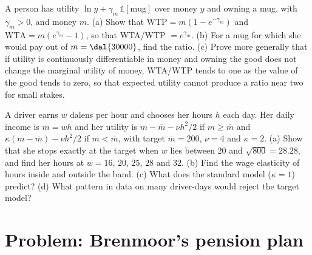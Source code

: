 \begin{exercise}[$\star\star\star$]\label{exo:b2:behavioural-evidence:11}
A person has utility $\ln y + \gamma_m\,\mathbb{1}[\text{mug}]$ over money $y$ and owning a mug, with
$\gamma_m > 0$, and money $m$. (a) Show that $\mathrm{WTP} = m(1 - e^{-\gamma_m})$ and $\mathrm{WTA} =
m(e^{\gamma_m} - 1)$, so that WTA/WTP $= e^{\gamma_m}$. (b) For a mug for which she would pay 
out of $m = \dal{30000}$, find the ratio. (c) Prove more generally that if utility is continuously differentiable in money and owning the good
does not change the marginal utility of money, WTA/WTP tends to one as the value of the good tends to
zero, so that expected utility cannot produce a ratio near two for small stakes.
\end{exercise}

\begin{exercise}[$\star\star\star$]\label{exo:b2:behavioural-evidence:12}
A driver earns $w$ dalens per hour and chooses her hours $h$ each day. Her daily income is $m = wh$ and
her utility is $m - \bar m - \nu h^2/2$ if $m \ge \bar m$ and $\kappa(m - \bar m) - \nu h^2/2$ if $m <
\bar m$, with target $\bar m = 200$, $\nu = 4$ and $\kappa = 2$. (a) Show that she stops exactly at the
target when $w$ lies between $20$ and $\sqrt{800} = 28.28$, and find her hours at $w = 16$, $20$, $25$,
$28$ and $32$. (b) Find the wage elasticity of hours inside and outside the band. (c) What does the
standard model ($\kappa = 1$) predict? (d) What pattern in data on many driver-days would reject the
target model?
\end{exercise}

\section{Problem: Brenmoor's pension plan}\label{sec:b2:behavioural-evidence:problem}

